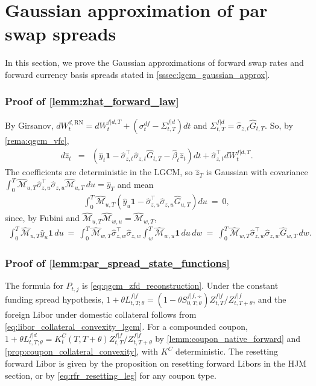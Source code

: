 \documentclass[11pt,english]{amsart}
\newcommand{\vun}{\mathbf{1}}
\newcommand{\RN}{\mathrm{RN}}
\theoremstyle{definition}
\begin{document}
\newpage%
\section{Gaussian approximation of par swap spreads}\label{sec:gaussian_approx_proofs}%

In this section, we prove the Gaussian approximations of forward swap rates and forward currency basis spreads stated in \autoref{sssec:lgcm_gaussian_approx}.

\subsubsection{Proof of \autoref{lemm:zhat_forward_law}}
By Girsanov, $dW^{d,\RN}_t = dW^{f|d,T}_t + \left(\sigma^{df}_t - \Sigma^{f|d}_{t,T}\right) dt$ and $\Sigma^{f|d}_{t,T} = \hat{\sigma}_{z,t}\hat{G}_{t,T}$. So, by \autoref{rema:qgcm_vfc},
\begin{eqnarray*}
  d\hat{z}_t &=& \left( \hat{y}_t\vun - \hat{\sigma}^\top_{z,t}\hat{\sigma}_{z,t}\hat{G}_{t,T} - \hat{\beta}_t \hat{z}_t\right) dt + \hat{\sigma}^\top_{z,t} dW^{f|d,T}_t .
\end{eqnarray*}
The coefficients are deterministic in the LGCM, so $\hat{z}_T$ is Gaussian with covariance $\int_0^T \hat{\mathcal{M}}_{u,T}\hat{\sigma}^\top_{z,u}\hat{\sigma}_{z,u}\hat{\mathcal{M}}_{u,T}\,du = \hat{y}_T$ and mean
\begin{eqnarray*}
  \int_0^T \hat{\mathcal{M}}_{u,T}\left(\hat{y}_u\vun - \hat{\sigma}^\top_{z,u}\hat{\sigma}_{z,u}\hat{G}_{u,T}\right) du ~=~ 0 ,
\end{eqnarray*}
since, by Fubini and $\hat{\mathcal{M}}_{u,T}\hat{\mathcal{M}}_{w,u} = \hat{\mathcal{M}}_{w,T}$,
\begin{eqnarray*}
  \int_0^T \hat{\mathcal{M}}_{u,T}\hat{y}_u\vun\, du ~=~ \int_0^T \hat{\mathcal{M}}_{w,T} \hat{\sigma}^\top_{z,w}\hat{\sigma}_{z,w} \int_w^T \hat{\mathcal{M}}_{w,u}\vun \, du\, dw ~=~ \int_0^T \hat{\mathcal{M}}_{w,T} \hat{\sigma}^\top_{z,w}\hat{\sigma}_{z,w} \hat{G}_{w,T}\, dw .
\end{eqnarray*}

\subsubsection{Proof of \autoref{lemm:par_spread_state_functions}}
The formula for $P_{t,j}$ is \eqref{eq:qgcm_zfd_reconstruction}. Under the constant funding spread hypothesis, $1+\theta L^{f|f}_{t,T;\theta} = (1-\theta S^{f|f,\div}_{0,T;\theta})Z^{f|f}_{t,T}/Z^{f|f}_{t,T+\theta}$, and the foreign Libor under domestic collateral follows from \eqref{eq:libor_collateral_convexity_lgcm}. For a compounded coupon, $1+\theta L^{f|d}_{t,T;\theta} = K^C_t(T,T+\theta)Z^{f|f}_{t,T}/Z^{f|f}_{t,T+\theta}$ by \autoref{lemm:coupon_native_forward} and \autoref{prop:coupon_collateral_convexity}, with $K^C$ deterministic. The resetting forward Libor is given by the proposition on resetting forward Libors in the HJM section, or by \eqref{eq:rfr_resetting_leg} for any coupon type.
\end{document}
